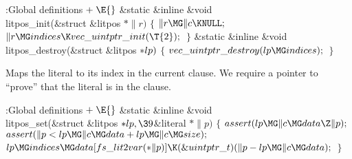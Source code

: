 {{{{{
\Y\B\4:Global definitions\X${}\mathrel+\E{}$\6
\&{static} \&{inline} \&{void} \\{litpos\_init}(\&{struct} \&{litpos} ${}{*}%
\|r){}$\1\1\2\2\6
${}\{{}$\1\6
${}\|r\MG\|c\K\NULL;{}$\6
${}\|r\MG\\{indices}\K\\{vec\_uintptr\_init}(\T{2});{}$\6
\4${}\}{}$\2\7
\&{static} \&{inline} \&{void} \\{litpos\_destroy}(\&{struct} \&{litpos} ${}{*}%
\\{lp}){}$\1\1\2\2\6
${}\{{}$\1\6
${}\\{vec\_uintptr\_destroy}(\\{lp}\MG\\{indices});{}$\6
\4${}\}{}$\2\par
\fi

Maps the literal  to its index in the current clause. We
require a pointer
to ``prove'' that the literal is in the clause.

\Y\B\4:Global definitions\X${}\mathrel+\E{}$\6
\&{static} \&{inline} \&{void} \\{litpos\_set}(\&{struct} \&{litpos} ${}{*}%
\\{lp},\39{}$\&{literal} ${}{*}\|p){}$\1\1\2\2\6
${}\{{}$\1\6
${}\\{assert}(\\{lp}\MG\|c\MG\\{data}\Z\|p);{}$\6
${}\\{assert}(\|p<\\{lp}\MG\|c\MG\\{data}+\\{lp}\MG\|c\MG\\{size});{}$\6
${}\\{lp}\MG\\{indices}\MG\\{data}[\\{fs\_lit2var}({*}\|p)]\K(\&{uintptr\_t})(%
\|p-\\{lp}\MG\|c\MG\\{data});{}$\6
\4${}\}{}$\2\par
\fi

}}}}}
